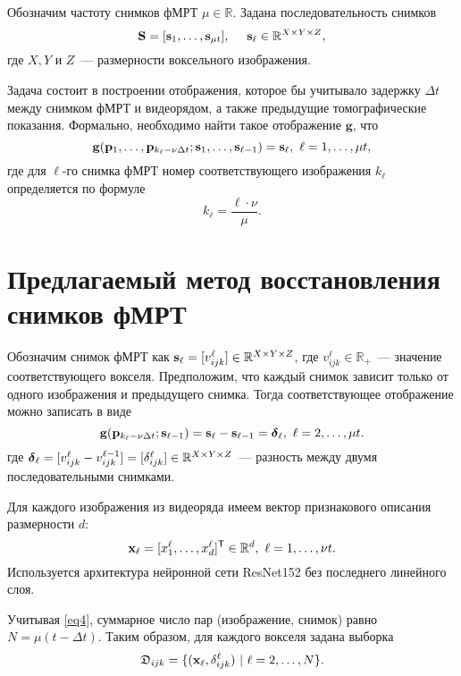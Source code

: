 \documentclass[a4paper, 12pt]{article}
\begin{document}
	Обозначим частоту снимков фМРТ $\mu \in \mathbb{R}$. Задана последовательность снимков 
	\begin{equation}
		\label{eq2}
		\mathbf{S} = [\mathbf{s}_1, \ldots, \mathbf{s}_{\mu t}], \quad\
		\mathbf{s}_{\ell} \in \mathbb{R}^{X \times Y \times Z},
	\end{equation}
	где $X, Y$ и $Z$~--- размерности воксельного изображения. 

	Задача состоит в построении отображения, которое бы учитывало задержку $\Delta t$ между
	снимком фМРТ и видеорядом, а также предыдущие томографические показания. Формально, необходимо
	найти такое отображение $\mathbf{g}$, что
	\begin{equation}
		\label{eq3}
		\mathbf{g}(\mathbf{p}_1, \ldots, \mathbf{p}_{k_{\ell} - \nu \Delta t}; \mathbf{s}_1, \ldots, \mathbf{s}_{\ell-1}) = \mathbf{s}_{\ell},
		\ \ell = 1, \ldots, \mu t,
	\end{equation}
	где для $\ell$-го снимка фМРТ номер соответствующего изображения $k_{\ell}$ определяется по формуле
	\begin{equation}
		\label{eq4}
		k_{\ell} = \dfrac{\ell \cdot \nu}{\mu}.
	\end{equation}

\section{Предлагаемый метод восстановления снимков фМРТ}

	Обозначим снимок фМРТ как $\mathbf{s}_{\ell} = [v^{\ell}_{ijk}] \in \mathbb{R}^{X \times Y \times Z}$,
	где $v^{\ell}_{ijk} \in \mathbb{R}_+$~--- значение соответствующего вокселя.
	Предположим, что каждый снимок зависит только от одного изображения и предыдущего снимка.
	Тогда соответствующее отображение можно записать в виде
	\begin{equation}
		\label{eq5}
		\mathbf{g}(\mathbf{p}_{k_{\ell} - \nu \Delta t}; \mathbf{s}_{\ell-1}) = \mathbf{s}_{\ell} - \mathbf{s}_{\ell-1} = \boldsymbol{\delta}_{\ell}, \ \ell = 2, \ldots, \mu t.
	\end{equation}
	где $\boldsymbol{\delta}_{\ell} = [v^{\ell}_{ijk} - v^{\ell-1}_{ijk}] = [\delta^{\ell}_{ijk}] \in \mathbb{R}^{X \times Y \times Z}$~--- разность между двумя последовательными снимками.

	Для каждого изображения из видеоряда имеем вектор признакового описания размерности $d$:
	\[ \mathbf{x}_{\ell} = [x^{\ell}_1, \ldots, x^{\ell}_{d}]^{\mathsf{T}} \in \mathbb{R}^{d}, \ {\ell} = 1, \ldots, \nu t. \]
	Используется архитектура нейронной сети ResNet152 без последнего линейного слоя.

	Учитывая \eqref{eq4}, суммарное число пар (изображение, снимок) 
	равно $N = \mu (t - \Delta t)$. Таким образом, для каждого вокселя задана выборка
	\[ \mathfrak{D}_{ijk} = \{(\mathbf{x}_{\ell}, \delta^{\ell}_{ijk}) \ | \ {\ell} = 2, \ldots, N \}. \]
\end{document}
